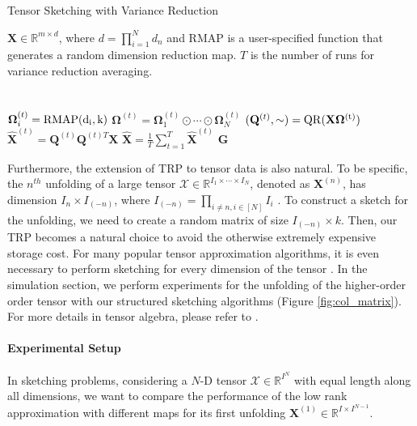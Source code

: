 \begin{algorithm}[H]
	\caption{Tensor Sketching with Variance Reduction}\label{alg:var-red-structure-sketching}
	\begin{algorithmic}[1]
		\Require $\mathbf{X} \in \mathbb{R}^{m \times d}$, where $d = \prod_{i=1}^N d_n$ and 
		\rm{RMAP} is a user-specified function that generates a random dimension reduction map. $T$ is the number of runs for variance reduction averaging. 
		\\
		\\
		 \\
		$\mathbf{\Omega}_i^{(t)} = \rm{RMAP}(d_i, k)$
		\State $\mathbf{\Omega}^{(t)} = \mathbf{\Omega}_1^{(t)} \odot \cdots \odot \mathbf{\Omega}_{N}^{(t)}$
		\State $(\mathbf{Q}^{(t)}, \sim ) = \rm{QR}(\mathbf{X}\mathbf{\Omega}^{(t)})$ 
		\State $\hat{\mathbf{X}}^{(t)} = \mathbf{Q}^{(t)}\mathbf{Q}^{(t)T}\mathbf{X}$
		\State
		$\hat{\mathbf{X}} = \frac{1}{T}\sum_{t=1}^T \hat{\mathbf{X}}^{(t)}$
		\State \Return $\mathbf{G}$
		\EndFunction
	\end{algorithmic}
\end{algorithm}

Furthermore, the extension of TRP to tensor data is also natural. To be specific, the $n^{th}$ unfolding of a large tensor $\mathscr{X} \in \mathbb{R}^{I_1 \times \cdots \times I_N}$, denoted as $\mathbf{X}^{(n)}$, has dimension $I_n \times I_{(-n)}$, where $I_{(-n)} = \prod_{i \neq n, i \in [N]} I_i$ . To construct a sketch for the unfolding, we need to create a random matrix of size $ I_{(-n)} \times k$. Then, our TRP becomes a natural choice to avoid the otherwise extremely expensive storage cost. For many popular tensor approximation algorithms, it is even necessary to perform sketching for every dimension of the tensor \cite{de2000multilinear,wang2015fast}. 
In the simulation section, we perform experiments for the unfolding of the higher-order order tensor with our structured sketching algorithms (Figure \ref{fig:col_matrix}). For more details in tensor algebra, please refer to \cite{kolda2009tensor}. 


\paragraph{Experimental Setup}
In sketching problems, considering a $N$-D tensor $\mathscr{X} \in \mathbb{R}^{I^N}$ with equal length along all dimensions, we want to compare the performance of the low rank approximation with different maps for its first unfolding $\mathbf{X}^{(1)} \in \mathbb{R}^{I \times I^{N-1}}$. 
	
